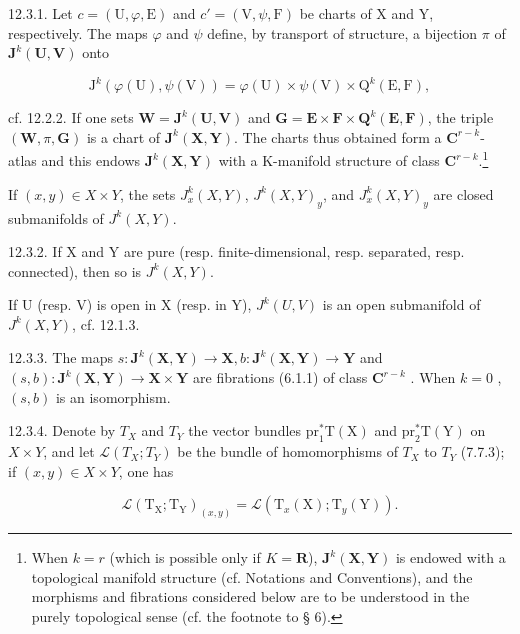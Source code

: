 12.3.1. Let \(c = (\mathrm{U}, \varphi, \mathrm{E})\) and \(c' = (\mathrm{V}, \psi, \mathrm{F})\) be charts of X and Y, respectively. The maps \(\varphi\) and \(\psi\) define, by transport of structure, a bijection \(\pi\) of \(\mathbf{J}^k (\mathbf{U},\mathbf{V})\) onto

\[
\mathrm{J} ^ {k} (\varphi (\mathrm{U}), \psi (\mathrm{V})) = \varphi (\mathrm{U}) \times \psi (\mathrm{V}) \times \mathrm{Q} ^ {k} (\mathrm{E}, \mathrm{F}),
\]

cf. 12.2.2. If one sets \(\mathbf{W} = \mathbf{J}^{k}(\mathbf{U},\mathbf{V})\) and \(\mathbf{G} = \mathbf{E}\times \mathbf{F}\times \mathbf{Q}^{k}(\mathbf{E},\mathbf{F})\), the triple \((\mathbf{W},\pi ,\mathbf{G})\) is a chart of \(\mathbf{J}^k (\mathbf{X},\mathbf{Y})\). The charts thus obtained form a \(\mathbf{C}^{r - k}\)-atlas and this endows \(\mathbf{J}^k (\mathbf{X},\mathbf{Y})\) with a K-manifold structure of class \(\mathbf{C}^{r - k}\).\footnote{When \(k=r\) (which is possible only if \(K=\mathbf{R}\)), \(\mathbf{J}^{k}(\mathbf{X},\mathbf{Y})\) is endowed with a topological manifold structure (cf. Notations and Conventions), and the morphisms and fibrations considered below are to be understood in the purely topological sense (cf. the footnote to § 6).}

If \((x, y) \in X \times Y\), the sets \(J_{x}^{k}(X, Y)\), \(J^{k}(X, Y)_{y}\), and \(J_{x}^{k}(X, Y)_{y}\) are closed submanifolds of \(J^{k}(X, Y)\).

12.3.2. If X and Y are pure (resp. finite-dimensional, resp. separated, resp. connected), then so is \(J^{k}(X, Y)\).

If U (resp. V) is open in X (resp. in Y), \(J^{k}(U, V)\) is an open submanifold of \(J^{k}(X, Y)\), cf. 12.1.3.

12.3.3. The maps \(s: \mathbf{J}^{k}(\mathbf{X}, \mathbf{Y}) \to \mathbf{X}, b: \mathbf{J}^{k}(\mathbf{X}, \mathbf{Y}) \to \mathbf{Y}\) and \((s, b): \mathbf{J}^{k}(\mathbf{X}, \mathbf{Y}) \to \mathbf{X} \times \mathbf{Y}\) are fibrations (6.1.1) of class \(\mathbf{C}^{r - k}\) . When \(k = 0\) , \((s, b)\) is an isomorphism.

12.3.4. Denote by \(T_{X}\) and \(T_{Y}\) the vector bundles \(\mathrm{pr}_{1}^{*}\mathrm{T}(\mathrm{X})\) and \(\mathrm{pr}_{2}^{*}\mathrm{T}(\mathrm{Y})\) on \(X \times Y\), and let \(\mathcal{L}(T_{X}; T_{Y})\) be the bundle of homomorphisms of \(T_{X}\) to \(T_{Y}\) (7.7.3); if \((x, y) \in X \times Y\), one has

\[
\mathcal {L} (\mathrm{T} _ {\mathrm{X}}; \mathrm{T} _ {\mathrm{Y}}) _ {(x, y)} = \mathcal {L} (\mathrm{T} _ {x} (\mathrm{X}); \mathrm{T} _ {y} (\mathrm{Y})).
\]

